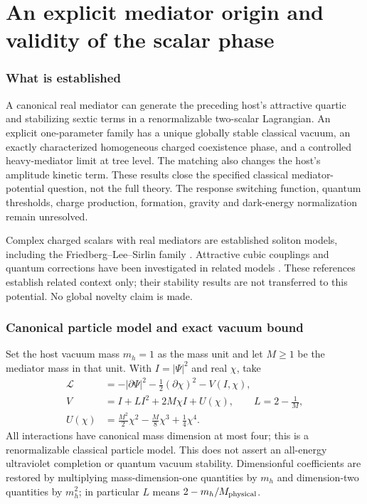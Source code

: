 \documentclass[11pt]{article}
\begin{document}
\clearpage

\part{An explicit mediator origin and validity of the scalar phase}

\section{What is established}
A canonical real mediator can generate the preceding host's attractive
quartic and stabilizing sextic terms in a renormalizable two-scalar
Lagrangian. An explicit one-parameter family has a unique globally stable
classical vacuum, an exactly characterized homogeneous charged coexistence
phase, and a controlled heavy-mediator limit at tree level. The matching
also changes the host's amplitude kinetic term. These results close the
specified classical mediator-potential question, not the full theory.
The response switching function, quantum thresholds, charge production,
formation, gravity and dark-energy normalization remain unresolved.

Complex charged scalars with real mediators are established soliton models,
including the Friedberg--Lee--Sirlin family \cite{uv:FLS}. Attractive cubic
couplings and quantum corrections have been investigated in related
models \cite{uv:attractive,uv:quantum}. These references establish related
context only; their stability results are not transferred to this potential.
No global novelty claim is made.

\section{Canonical particle model and exact vacuum bound}
Set the host vacuum mass $m_h=1$ as the mass unit and let $M\ge1$ be
the mediator mass in that unit. With $I=|\Psi|^2$ and real $\chi$, take
\begin{align}
 \mathcal L&=-|\partial\Psi|^2-\tfrac12(\partial\chi)^2-V(I,\chi),\\
 V&=I+L I^2+2M\chi I+U(\chi),\qquad L=2-\frac1M,\\
 U(\chi)&=\frac{M^2}{2}\chi^2-\frac M8\chi^3+\frac14\chi^4.
 \label{uv:potential}
\end{align}
All interactions have canonical mass dimension at most four; this is a
renormalizable classical particle model. This does not assert an
all-energy ultraviolet completion or quantum vacuum stability. Dimensionful
coefficients are restored by multiplying mass-dimension-one quantities by
$m_h$ and dimension-two quantities by $m_h^2$; in particular $L$ means
$2-m_h/M_{\rm physical}$.
\end{document}
